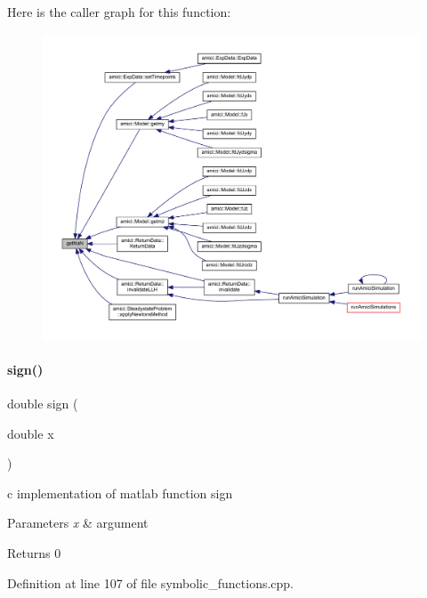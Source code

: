 Here is the caller graph for this function\+:
\nopagebreak
\begin{figure}[H]
\begin{center}
\leavevmode
\includegraphics[width=350pt]{namespaceamici_ad41a03e53c2aaeeb82aad5791bf3ee28_icgraph}
\end{center}
\end{figure}
\mbox{\label{namespaceamici_a8f3cba07aa75b7320ae8bd6c0aeac498}} 
\paragraph{\texorpdfstring{sign()}{sign()}}
{\footnotesize\ttfamily double sign (\begin{DoxyParamCaption}\item[{double}]{x }\end{DoxyParamCaption})}

c implementation of matlab function sign


\begin{DoxyParams}{Parameters}
{\em x} & argument \\
\hline
\end{DoxyParams}
\begin{DoxyReturn}{Returns}
0 
\end{DoxyReturn}


Definition at line 107 of file symbolic\+\_\+functions.\+cpp.

\mbox{\label{namespaceamici_a34f81e95053af0b2d366f7ab636e603a}} 
